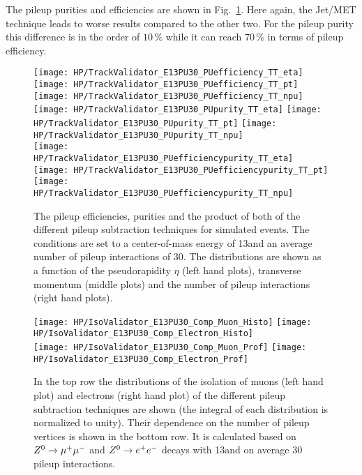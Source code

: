 The pileup purities and efficiencies are shown in Fig.~\ref{plot:HPUTAE13PU30TTPUComp}. Here again, the Jet/MET technique leads to worse results compared to the other two. For the pileup purity this difference is in the order of $10\,\%$ while it can reach $70\,\%$ in terms of pileup efficiency. 

\begin{figure}[!t]
  \centering
  \texttt{[image: HP/TrackValidator\_E13PU30\_PUefficiency\_TT\_eta]}
  \texttt{[image: HP/TrackValidator\_E13PU30\_PUefficiency\_TT\_pt]}
  \texttt{[image: HP/TrackValidator\_E13PU30\_PUefficiency\_TT\_npu]}
   \\
  \texttt{[image: HP/TrackValidator\_E13PU30\_PUpurity\_TT\_eta]}
  \texttt{[image: HP/TrackValidator\_E13PU30\_PUpurity\_TT\_pt]}
  \texttt{[image: HP/TrackValidator\_E13PU30\_PUpurity\_TT\_npu]}
   \\
  \texttt{[image: HP/TrackValidator\_E13PU30\_PUefficiencypurity\_TT\_eta]}
  \texttt{[image: HP/TrackValidator\_E13PU30\_PUefficiencypurity\_TT\_pt]}
  \texttt{[image: HP/TrackValidator\_E13PU30\_PUefficiencypurity\_TT\_npu]}
  \caption[Pileup efficiencies, purities and their product of the different pileup subtraction techniques based on simulated \ttbar events with 13\TeV and $\left<PU\right>=30$]{The pileup efficiencies, purities and the product of both of the different pileup subtraction techniques for simulated \ttbar events. The conditions are set to a center-of-mass energy of 13\TeV and an average number of pileup interactions of 30. The distributions are shown as a function of the pseudorapidity $\eta$ (left hand plots), transverse momentum (middle plots) and the number of pileup interactions (right hand plots). \label{plot:HPUTAE13PU30TTPUComp}}
\end{figure}
\clearpage{}

\begin{figure}[Hb]
    \centering
    \texttt{[image: HP/IsoValidator\_E13PU30\_Comp\_Muon\_Histo]}
    \texttt{[image: HP/IsoValidator\_E13PU30\_Comp\_Electron\_Histo]}
    \\
    \texttt{[image: HP/IsoValidator\_E13PU30\_Comp\_Muon\_Prof]}
    \texttt{[image: HP/IsoValidator\_E13PU30\_Comp\_Electron\_Prof]}
    \caption[Distribution of the isolation of muons and electrons and their dependence on the number of pileup vertices for events with 13\TeV and $\left<PU\right>=30$]{In the top row the distributions of the isolation of muons (left hand plot) and electrons (right hand plot) of the different pileup subtraction techniques are shown (the integral of each distribution is normalized to unity). Their dependence on the number of pileup vertices is shown in the bottom row. It is calculated based on ${Z^{0}}\rightarrow\mu^+\mu^-$ and ${Z^{0}}\rightarrow e^+e^-$ decays with 13\TeV and on average 30 pileup interactions.\label{plot:HPUIsoE13PU30}}
\end{figure}

